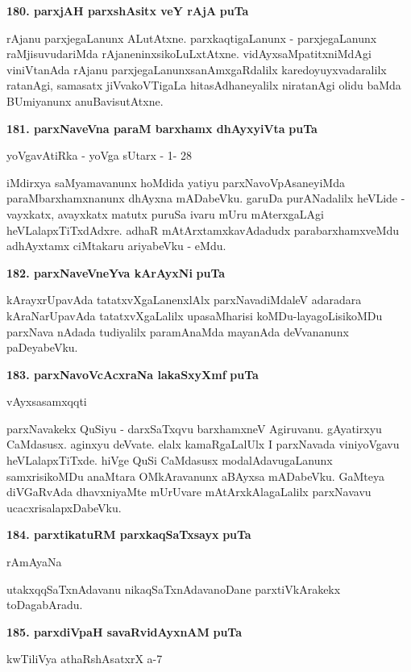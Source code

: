 \medskip
\noindent
\textbf{180. parxjAH parxshAsitx veY rAjA} \hfill{\bf puTa \pageref{92}}

\smallskip
rAjanu parxjegaLanunx ALutAtxne. parxkaqtigaLanunx - parxjegaLanunx raMjisuvudariMda rAjaneninxsikoLuLxtAtxne. vidAyxsaMpatitxniMdAgi viniVtanAda rAjanu parxjegaLanunx\break sanAmxgaR\-dalilx karedoyuyxvadaralilx ratanAgi, samasatx jiVvakoVTigaLa hitasAdhaneyalilx niratanAgi olidu baMda BUmiyanunx anuBavisutAtxne.

\eject

\noindent
\textbf{181. parxNaveVna paraM barxhamx dhAyxyiVta} \hfill{\bf puTa \pageref{147}}

\hfill{yoVgavAtiRka - yoVga sUtarx - 1- 28}

\smallskip
iMdirxya saMyamavanunx hoMdida yatiyu parxNavoVpAsaneyiMda paraMbarxhamxnanunx dhAyxna mADa\-beVku. garuDa purANadalilx heVLide - vayxkatx, avayxkatx matutx puruSa ivaru mUru mAterxgaLAgi heVLa\-lapxTiTx\-dAdxre. adhaR mAtArxtamxkavAdadudx parabarxhamxveMdu adhAyxtamx ciMtakaru ariyabeVku - eMdu.


\medskip
\noindent
\textbf{182. parxNaveVneYva kArAyxNi} \hfill{\bf puTa \pageref{150}}

\smallskip
kArayxrUpavAda tatatxvXgaLanenxlAlx parxNavadiMdaleV adaradara kAraNarUpavAda tatatxvXgaLalilx upasaM\-hari\-si\- koMDu-layagoLisikoMDu parxNava nAdada tudiyalilx paramAnaMda mayanAda deVvananunx paDeya\-beVku.

\medskip
\noindent
\textbf{183. parxNavoVcAcxraNa lakaSxyXmf} \hfill{\bf puTa \pageref{147}}

\hfill{vAyxsasamxqqti}

\smallskip
parxNavakekx QuSiyu - darxSaTxqvu barxhamxneV Agiruvanu. gAyatirxyu CaMdasusx. aginxyu deVvate. elalx kamaRgaLalUlx I parxNavada viniyoVgavu heVLalapxTiTxde. hiVge QuSi CaMdasusx modalAdavugaLanunx samxrisikoMDu anaMtara OMkAravanunx aBAyxsa mADabeVku. GaMteya diVGaRvAda dhavxniyaMte mUrU\-vare mAtArxkAlagaLalilx parxNavavu ucacxrisalapxDabeVku.

\medskip
\noindent
\textbf{184. parxtikatuRM parxkaqSaTxsayx} \hfill{\bf puTa \pageref{223}}

\hfill{rAmAyaNa}

\smallskip
utakxqqSaTxnAdavanu nikaqSaTxnAdavanoDane parxtiVkArakekx toDagabAradu.

\medskip
\noindent
\textbf{185. parxdiVpaH savaRvidAyxnAM} \hfill{\bf puTa \pageref{89}}

\hfill{kwTiliVya athaRshAsatxrX a-7}

